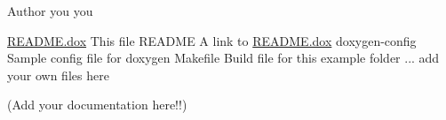 \begin{DoxyAuthor}{Author}
you you
\end{DoxyAuthor}

\begin{DoxyPre}\end{DoxyPre}



\begin{DoxyPre}\hyperlink{README_8dox}{README.dox}          This file
README              A link to \hyperlink{README_8dox}{README.dox}
doxygen-config      Sample config file for doxygen
Makefile            Build file for this example folder
... add your own files here\end{DoxyPre}



\begin{DoxyPre}(Add your documentation here!!)
\end{DoxyPre}
 